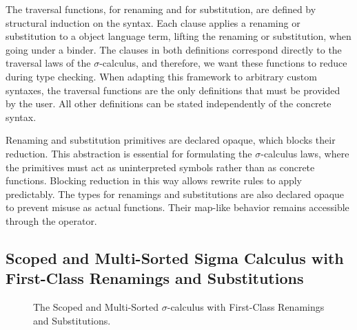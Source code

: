\documentclass[screen,nonacm]{acmart}
\begin{document}
The traversal functions,  for renaming and
 for substitution, are defined by structural induction on
the syntax. Each clause applies a renaming or substitution to a object language
term, lifting the renaming or substitution, when going under a binder. The
clauses in both definitions correspond directly to the traversal laws of the
$\sigma$-calculus, and therefore, we want these functions to reduce during type
checking. When adapting this framework to arbitrary custom syntaxes, the
traversal functions are the only definitions that must be provided by the user.
All other definitions can be stated independently of the concrete syntax.

Renaming and substitution primitives are declared opaque, which blocks their
reduction. This abstraction is essential for formulating the $\sigma$-calculus
laws, where the primitives must act as uninterpreted symbols rather than as
concrete functions. Blocking reduction in this way allows rewrite rules to
apply predictably. The types for renamings and substitutions are also declared
opaque to prevent misuse as actual functions. Their map-like behavior remains
accessible through the \AgdaFunction{\_\&\_} operator.

\subsection{Scoped and Multi-Sorted Sigma Calculus with First-Class Renamings and Substitutions}\label{sec:mis-sig}
\begin{figure}[t]
      \centering

      \begin{minipage}[t]{0.38\linewidth}
            \raggedright{}
            \EDefLaws{}
            \ERewriteSys{}
      \end{minipage}
      \hfill
      \begin{minipage}[t]{0.58\linewidth}
            \raggedright{}
            \EInteractLaws{}
            \EMonadLaws{}
      \end{minipage}

      \caption{The Scoped and Multi-Sorted $\sigma$-calculus with First-Class Renamings and Substitutions.}
      \label{fig:mis-sig}
\end{figure}
\end{document}
